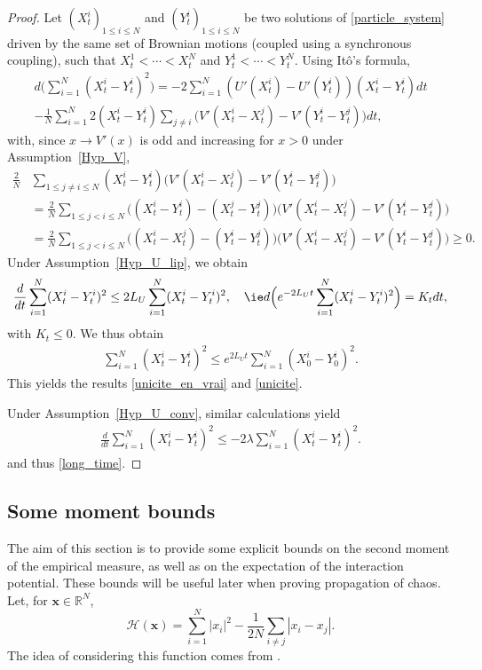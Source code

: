 \documentclass[10pt]{amsart}
\newcommand{\bx}{{\boldsymbol{x}}}
\theoremstyle{plain}
\theoremstyle{definition}
\begin{document}
\begin{proof}

Let $(X^i_t)_{1\leq i\leq N}$ and $(Y^i_t)_{1\leq i\leq N}$ be two solutions of \eqref{particle_system} driven by the same set of Brownian motions (\ie coupled using a synchronous coupling), such that \hbox{$X^1_t<\cdots<X^N_t$} and $Y^1_t<\cdots<Y^N_t$. Using Itô's formula,
\begin{multline*}
d\biggl(\sum_{i=1}^N(X^i_t-Y^i_t)^2\biggr)=-2\sum_{i=1}^N\left(U'(X^i_t)-U'(Y^i_t)\right)(X^i_t-Y^i_t)dt\\[-5pt]
-\frac{1}{N}\sum_{i=1}^N2(X^i_t-Y^i_t)\sum_{j\neq i}\bigl(V'(X^i_t-X^j_t)-V'(Y^i_t-Y^j_t)\bigr)dt,
\end{multline*}
with, since $x\to V'(x)$ is odd and increasing for $x>0$ under Assumption~\ref{Hyp_V},
\begin{align*}
\frac{2}{N}&\sum_{1\leq j\neq i\leq N}(X^i_t-Y^i_t)\bigl(V'(X^i_t-X^j_t)-V'(Y^i_t-Y^j_t)\bigr)\\
&=\frac{2}{N}\sum_{1\leq j<i\leq N}\bigl((X^i_t-Y^i_t)-(X^j_t-Y^j_t)\bigr)\bigl(V'(X^i_t-X^j_t)-V'(Y^i_t-Y^j_t)\bigr)\\
&=\frac{2}{N}\sum_{1\leq j<i\leq N}\bigl((X^i_t-X^j_t)-(Y^i_t-Y^j_t)\bigr)\bigl(V'(X^i_t-X^j_t)-V'(Y^i_t-Y^j_t)\bigr)\geq0.
\end{align*}
Under Assumption~\ref{Hyp_U_lip}, we obtain
\[
\frac{d}{dt}\sum_{i=1}^N(X^i_t-Y^i_t)^2\leq 2L_U\sum_{i=1}^N (X^i_t-Y^i_t)^2,
\quad\text{\ie}
d \Bigl(e^{-2L_U t}\sum_{i=1}^N(X^i_t-Y^i_t)^2\Bigr)=K_tdt,
\]
with $K_t\leq0$. We thus obtain
\begin{align*}
\sum_{i=1}^N(X^i_t-Y^i_t)^2\leq e^{2L_U t}\sum_{i=1}^N(X^i_0-Y^i_0)^2.
\end{align*}
This yields the results \eqref{unicite_en_vrai} and \eqref{unicite}.

Under Assumption~\ref{Hyp_U_conv}, similar calculations yield
\begin{align*}
\frac{d}{dt}\sum_{i=1}^N(X^i_t-Y^i_t)^2\leq-2\lambda\sum_{i=1}^N (X^i_t-Y^i_t)^2.
\end{align*}
and thus \eqref{long_time}.
\end{proof}

\subsection{Some moment bounds}\label{sec_bornes}

The aim of this section is to provide some explicit bounds on the second moment of the empirical measure, as well as on the expectation of the interaction potential. These bounds will be useful later when proving propagation of chaos. Let, for $\bx\in\mathbb{R}^N$,
\begin{equation}\label{def_H_cal}
\mathcal{H}(\bx)=\sum_{i=1}^N\left|x_i\right|^2-\frac{1}{2N}\sum_{i\neq j}|x_i-x_j|.
\end{equation}
The idea of considering this function comes from \cite{lu_mattingly}.
\end{document}

